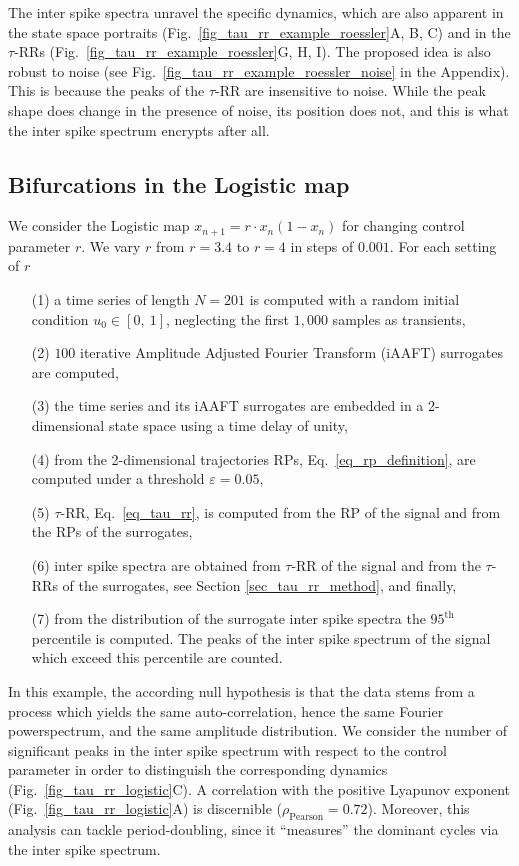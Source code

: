 \documentclass[entropy,article,submit,pdftex,moreauthors]{Definitions/mdpi}
\begin{document}
The inter spike spectra unravel the specific dynamics, which are also apparent in the state space portraits (Fig.~\ref{fig_tau_rr_example_roessler}A, B, C) and in the 
$\tau$-RRs (Fig.~\ref{fig_tau_rr_example_roessler}G, H, I). The proposed idea is also 
robust to noise (see Fig.~\ref{fig_tau_rr_example_roessler_noise} in the Appendix). This is because the peaks of the $\tau$-RR are insensitive to noise. While the peak shape does 
change in the presence of noise, its position does not, and this is what the inter spike spectrum encrypts after all.

\subsection{Bifurcations in the Logistic map}

We consider the Logistic map $x_{n+1}=r\cdot x_n \left( 1-x_n \right)$ for changing control parameter $r$. We vary $r$ from $r=3.4$ to $r=4$ in steps of $0.001$. For 
each setting of $r$ 
\begin{itemize}[noitemsep]
\item[(1)] a time series of length $N=201$ is computed with a random initial condition $u_0 \in [0,\ 1]$, neglecting the first $1,000$ samples as transients,
\item[(2)] $100$ iterative Amplitude Adjusted Fourier Transform (iAAFT) surrogates \cite{Schreiber1996,Schreiber2000} are computed,
\item[(3)] the time series and its iAAFT surrogates are embedded in a 2-dimensional state space using a time delay of unity,
\item[(4)] from the 2-dimensional trajectories RPs, Eq.~\eqref{eq_rp_definition}, are computed under a threshold $\varepsilon=0.05$,
\item[(5)] $\tau$-RR, Eq.~\eqref{eq_tau_rr}, is computed from the RP of the signal and from the RPs of the surrogates,
\item[(6)] inter spike spectra are obtained from $\tau$-RR of the signal and from the $\tau$-RRs of the surrogates, see Section \ref{sec_tau_rr_method}, and finally,
\item[(7)] from the distribution of the surrogate inter spike spectra the $95^\text{th}$ percentile is computed. The peaks of the inter spike spectrum of the signal which exceed 
this percentile are counted. 
\end{itemize}
In this example, the according null hypothesis is that the data stems from a process which yields the same auto-correlation, hence the same Fourier powerspectrum, and the same 
amplitude distribution. We consider the number of significant peaks in the inter spike spectrum with
respect to the control parameter in order to distinguish the corresponding dynamics (Fig.~\ref{fig_tau_rr_logistic}C).
A correlation with the positive Lyapunov exponent (Fig.~\ref{fig_tau_rr_logistic}A) is discernible 
($\rho_{\text{Pearson}}=0.72$). Moreover, this analysis can tackle period-doubling, since it ``measures'' the dominant cycles via the inter spike spectrum. 
\end{document}
